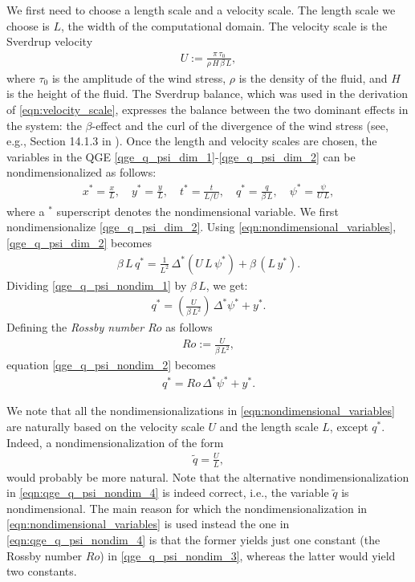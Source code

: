 We first need to choose a length scale and a velocity scale. The length scale we choose is $L$, the
width of the computational domain. The velocity scale is the Sverdrup velocity
\begin{align}
  U := \frac{\pi \, \tau_0}{\rho \, H \, \beta \, L} , \label{eqn:velocity_scale}
\end{align}
where $\tau_0$ is the amplitude of the wind stress, $\rho$ is the density of the fluid, and $H$ is
the height of the fluid. The Sverdrup balance, which was used in the derivation of
\eqref{eqn:velocity_scale}, expresses the balance between the two dominant effects in the system:
the $\beta$-effect and the curl of the divergence of the wind stress (see, e.g., Section 14.1.3 in
\cite{Vallis06}). Once the length and velocity scales are chosen, the variables in the QGE
\eqref{qge_q_psi_dim_1}-\eqref{qge_q_psi_dim_2} can be nondimensionalized as follows:
\begin{align}
  x^* = \frac{x}{L}, \quad 
  y^* = \frac{y}{L}, \quad 
  t^* = \frac{t}{L / U}, \quad 
  q^* = \frac{q}{\beta \, L}, \quad
  \psi^* = \frac{\psi}{U \, L} ,
\label{eqn:nondimensional_variables}
\end{align}
where a $^*$ superscript denotes the nondimensional variable. We first nondimensionalize
\eqref{qge_q_psi_dim_2}. Using \eqref{eqn:nondimensional_variables}, \eqref{qge_q_psi_dim_2}
becomes
\begin{align}
  \beta \, L \, q^* = \frac{1}{L^2} \, \Delta^* (U \, L \, \psi^*) + \beta \, (L \, y^*) .
  \label{qge_q_psi_nondim_1}
\end{align}
Dividing \eqref{qge_q_psi_nondim_1} by $\beta \, L$, we get:
\begin{align}
  q^* = \left( \frac{U}{\beta \, L^2} \right) \, \Delta^* \psi^* + y^* .
  \label{qge_q_psi_nondim_2}
\end{align}
Defining the \emph{Rossby number $Ro$} as follows
\begin{align}
  Ro := \frac{U}{\beta \, L^2} , \label{eqn:rossby_number}
\end{align}
equation \eqref{qge_q_psi_nondim_2} becomes
\begin{align}
  q^* = Ro \, \Delta^* \psi^* + y^* .
  \label{qge_q_psi_nondim_3}
\end{align}

We note that all the nondimensionalizations in \eqref{eqn:nondimensional_variables} are naturally
based on the velocity scale $U$ and the length scale $L$, except $q^*$. Indeed, a
nondimensionalization of the form
\begin{align}
  {\tilde q} = \frac{U}{L},
  \label{eqn:qge_q_psi_nondim_4}
\end{align}
would probably be more natural. Note that the alternative nondimensionalization in
\eqref{eqn:qge_q_psi_nondim_4} is indeed correct, i.e., the variable ${\tilde q}$ is nondimensional.
The main reason for which the nondimensionalization in \eqref{eqn:nondimensional_variables} is used
instead the one in \eqref{eqn:qge_q_psi_nondim_4} is that the former yields just one constant (the
Rossby number $Ro$) in \eqref{qge_q_psi_nondim_3}, whereas the latter would yield two constants.

